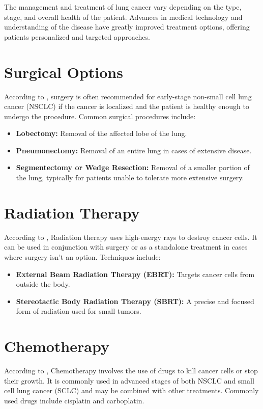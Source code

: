 \begin{remark}
The management and treatment of lung cancer vary depending on the type, stage, and overall health of the patient. Advances in medical technology and understanding of the disease have greatly improved treatment options, offering patients personalized and targeted approaches.
\end{remark}

\section{Surgical Options}
According to \cite{hoy2019surgical}, surgery is often recommended for early-stage non-small cell lung cancer (NSCLC) if the cancer is localized and the patient is healthy enough to undergo the procedure. Common surgical procedures include:
\begin{highlight}
\begin{itemize}
    \item \textbf{Lobectomy:} Removal of the affected lobe of the lung.
    \item \textbf{Pneumonectomy:} Removal of an entire lung in cases of extensive disease.
    \item \textbf{Segmentectomy or Wedge Resection:} Removal of a smaller portion of the lung, typically for patients unable to tolerate more extensive surgery.
\end{itemize}
\end{highlight}

\section{Radiation Therapy}
According to \cite{de2013state}, Radiation therapy uses high-energy rays to destroy cancer cells. It can be used in conjunction with surgery or as a standalone treatment in cases where surgery isn’t an option. Techniques include:
\begin{highlight}
\begin{itemize}
    \item \textbf{External Beam Radiation Therapy (EBRT):} Targets cancer cells from outside the body.
    \item \textbf{Stereotactic Body Radiation Therapy (SBRT):} A precise and focused form of radiation used for small tumors.
\end{itemize}
\end{highlight}

\section{Chemotherapy}
\begin{outline}
According to \cite{ihde1992chemotherapy}, Chemotherapy involves the use of drugs to kill cancer cells or stop their growth. It is commonly used in advanced stages of both NSCLC and small cell lung cancer (SCLC) and may be combined with other treatments. Commonly used drugs include cisplatin and carboplatin.
\end{outline}

